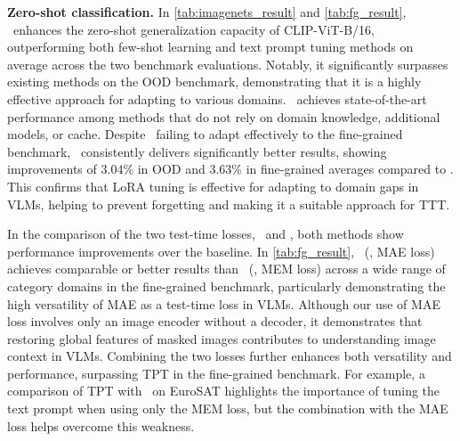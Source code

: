\textbf{Zero-shot classification.}\hspace{5mm}
In \cref{tab:imagenets_result} and \cref{tab:fg_result}, \name\ enhances the zero-shot generalization capacity of CLIP-ViT-B/16, outperforming both few-shot learning and text prompt tuning methods on average across the two benchmark evaluations. Notably, it significantly surpasses existing methods on the OOD benchmark, demonstrating that it is a highly effective approach for adapting to various domains.
\name\ achieves state-of-the-art performance among methods that do not rely on domain knowledge, additional models, or cache.
Despite \nameie\ failing to adapt effectively to the fine-grained benchmark, \name\ consistently delivers significantly better results, showing improvements of 3.04\% in OOD and 3.63\% in fine-grained averages compared to \nameie.
This confirms that LoRA tuning is effective for adapting to domain gaps in VLMs, helping to prevent forgetting and making it a suitable approach for TTT.

In the comparison of the two test-time losses, \namemem\ and \namemae, both methods show performance improvements over the baseline.
In \cref{tab:fg_result}, \namemae\ (\ie, MAE loss) achieves comparable or better results than \namemem\ (\ie, MEM loss) across a wide range of category domains in the fine-grained benchmark, particularly demonstrating the high versatility of MAE as a test-time loss in VLMs.
Although our use of MAE loss involves only an image encoder without a decoder, it demonstrates that restoring global features of masked images contributes to understanding image context in VLMs.
Combining the two losses further enhances both versatility and performance, surpassing TPT in the fine-grained benchmark.
For example, a comparison of TPT with \namemem\ on EuroSAT highlights the importance of tuning the text prompt when using only the MEM loss, but the combination with the MAE loss helps overcome this weakness.
\newline


